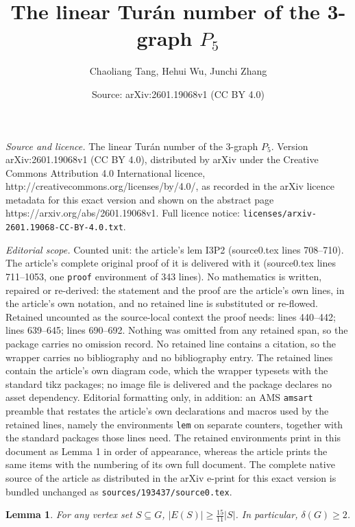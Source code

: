\documentclass[10pt,a4paper]{amsart}
\title{\vspace{-2cm}The linear Tur\'an number of the 3-graph $P_5$}
\author{Chaoliang Tang, Hehui Wu, Junchi Zhang}
\date{Source: arXiv:2601.19068v1 (CC BY 4.0)}
\newtheorem{lem}{Lemma}
\begin{document}
\maketitle

\noindent\emph{Source and licence.} \vspace{-2cm}The linear Tur\'an number of the 3-graph $P_5$. Version arXiv:2601.19068v1 (CC BY 4.0), distributed by arXiv under the Creative Commons Attribution 4.0 International licence, http://creativecommons.org/licenses/by/4.0/, as recorded in the arXiv licence metadata for this exact version and shown on the abstract page https://arxiv.org/abs/2601.19068v1. Full licence notice: \texttt{licenses/arxiv-2601.19068-CC-BY-4.0.txt}.\par\smallskip

\noindent\textit{Editorial scope.} Counted unit: the article's lem I3P2 (source0.tex lines 708--710). The article's complete original proof of it is delivered with it (source0.tex lines 711--1053, one \texttt{proof} environment of 343 lines). No mathematics is written, repaired or re-derived: the statement and the proof are the article's own lines, in the article's own notation, and no retained line is substituted or re-flowed.  Retained uncounted as the source-local context the proof needs: lines 440--442; lines 639--645; lines 690--692.  Nothing was omitted from any retained span, so the package carries no omission record.  No retained line contains a citation, so the wrapper carries no bibliography and no bibliography entry.  The retained lines contain the article's own diagram code, which the wrapper typesets with the standard tikz packages; no image file is delivered and the package declares no asset dependency.  Editorial formatting only, in addition: an AMS \texttt{amsart} preamble that restates the article's own declarations and macros used by the retained lines, namely the environments \texttt{lem} on separate counters, together with the standard packages those lines need.  The retained environments print in this document as Lemma 1 in order of appearance, whereas the article prints the same items with the numbering of its own full document.  The complete native source of the article as distributed in the arXiv e-print for this exact version is bundled unchanged as \texttt{sources/193437/source0.tex}.
\begin{lem}\label{contradiction}
    For any vertex set $S\subseteq G$, $|E(S)| \ge \frac{15}{11}|S|$. In particular, $\delta(G)\ge 2$.
\end{lem}
\end{document}
